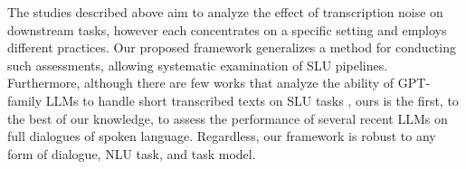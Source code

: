 
The studies described above aim to analyze the effect of transcription noise on downstream tasks, however each concentrates on a specific setting and employs different practices. Our proposed framework generalizes a method for conducting such assessments, allowing systematic examination of SLU pipelines.
Furthermore, although there are few works \citep{li2023gptSLU, zhu-etal-2024-zero} that analyze the ability of GPT-family LLMs to handle short transcribed texts on SLU tasks \citep[e.g., ASR-GLUE;][]{feng2022asrglue}, ours is the first, to the best of our knowledge, to assess the performance of several recent LLMs on full dialogues of spoken language. Regardless, our framework is robust to any form of dialogue, NLU task, and task model.









